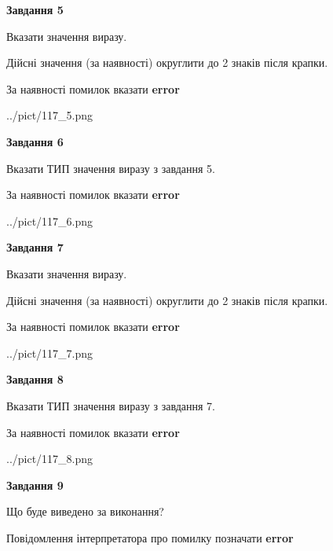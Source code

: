 \documentclass[11pt, ukrainian]{article}
\begin{document}
{\begin {large}
{\begin {center}\textbf{Завдання 5}\end {center}}\par
Вказати значення виразу. \par
Дійсні значення (за наявності) округлити до 2 знаків після крапки. \par
За наявності помилок вказати \textbf{error}

\begin{center}
	{../pict/117_5.png}
\end{center}
\newpage

{\begin {center}\textbf{Завдання 6}\end {center}}\par
Вказати ТИП значення виразу з завдання 5. \par
За наявності помилок вказати \textbf{error}

\begin{center}
	{../pict/117_6.png}
\end{center}
\newpage

{\begin {center}\textbf{Завдання 7}\end {center}}\par
Вказати значення виразу. \par
Дійсні значення (за наявності) округлити до 2 знаків після крапки. \par
За наявності помилок вказати \textbf{error}

\begin{center}
	{../pict/117_7.png}
\end{center}
\newpage

{\begin {center}\textbf{Завдання 8}\end {center}}\par
Вказати ТИП значення виразу з завдання 7. \par
За наявності помилок вказати \textbf{error}

\begin{center}
	{../pict/117_8.png}
\end{center}
\newpage

{\begin {center}\textbf{Завдання 9}\end {center}}\par
Що буде виведено за виконання? \par
Повідомлення інтерпретатора про помилку позначати \textbf{error}


\end{large}}
\end{document}
